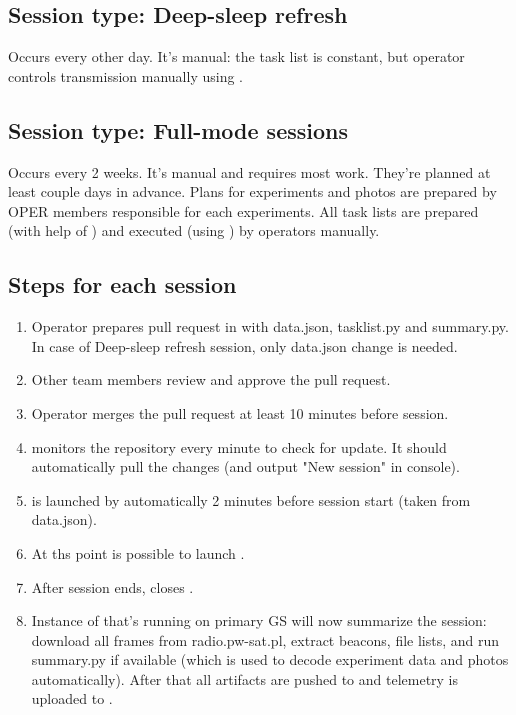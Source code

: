 \subsection{Session type: Deep-sleep refresh}
Occurs every other day. It's manual: the task list is constant, but operator controls transmission manually using .

\subsection{Session type: Full-mode sessions}
Occurs every 2 weeks. It's manual and requires most work. They're planned at least couple days in advance. Plans for experiments and photos are prepared by OPER members responsible for each experiments. All task lists are prepared (with help of ) and executed (using ) by operators manually.

\subsection{Steps for each session}

\begin{enumerate}
    \item Operator prepares pull request in  with data.json, tasklist.py and summary.py. In case of Deep-sleep refresh session, only data.json change is needed.
    \item Other team members review and approve the pull request.
    \item Operator merges the pull request at least 10 minutes before session.
    \item {} monitors the repository every minute to check for update. It should automatically pull the changes (and output "New session" in console).
    \item {} is launched by  automatically 2 minutes before session start (taken from data.json).
    \item At ths point is possible to launch .
    \item After session ends,  closes .
    \item Instance of  that's running on primary GS will now summarize the session: download all frames from radio.pw-sat.pl, extract beacons, file lists, and run summary.py if available (which is used to decode experiment data and photos automatically). After that all artifacts are pushed to  and telemetry is uploaded to .
\end{enumerate}


